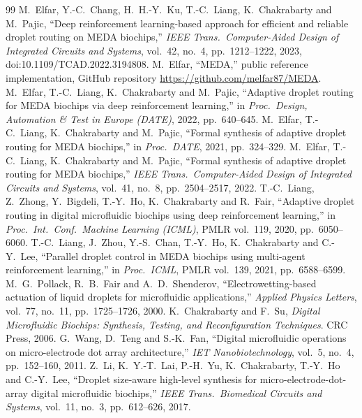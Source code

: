 \documentclass[11pt,a4paper]{article}
\begin{document}
\label{sec:refs}
\begin{thebibliography}{99}\small
{} M.~Elfar, Y.-C.~Chang, H.~H.-Y.~Ku, T.-C.~Liang, K.~Chakrabarty and M.~Pajic, ``Deep reinforcement learning-based approach for efficient and reliable droplet routing on MEDA biochips,'' \emph{IEEE Trans.\ Computer-Aided Design of Integrated Circuits and Systems}, vol.~42, no.~4, pp.~1212--1222, 2023, doi:10.1109/TCAD.2022.3194808.
 M.~Elfar, ``MEDA,'' public reference implementation, GitHub repository \url{https://github.com/melfar87/MEDA}.
 M.~Elfar, T.-C.~Liang, K.~Chakrabarty and M.~Pajic, ``Adaptive droplet routing for MEDA biochips via deep reinforcement learning,'' in \emph{Proc.\ Design, Automation \& Test in Europe (DATE)}, 2022, pp.~640--645.
 M.~Elfar, T.-C.~Liang, K.~Chakrabarty and M.~Pajic, ``Formal synthesis of adaptive droplet routing for MEDA biochips,'' in \emph{Proc.\ DATE}, 2021, pp.~324--329.
 M.~Elfar, T.-C.~Liang, K.~Chakrabarty and M.~Pajic, ``Formal synthesis of adaptive droplet routing for MEDA biochips,'' \emph{IEEE Trans.\ Computer-Aided Design of Integrated Circuits and Systems}, vol.~41, no.~8, pp.~2504--2517, 2022.
 T.-C.~Liang, Z.~Zhong, Y.~Bigdeli, T.-Y.~Ho, K.~Chakrabarty and R.~Fair, ``Adaptive droplet routing in digital microfluidic biochips using deep reinforcement learning,'' in \emph{Proc.\ Int.\ Conf.\ Machine Learning (ICML)}, PMLR vol.~119, 2020, pp.~6050--6060.
 T.-C.~Liang, J.~Zhou, Y.-S.~Chan, T.-Y.~Ho, K.~Chakrabarty and C.-Y.~Lee, ``Parallel droplet control in MEDA biochips using multi-agent reinforcement learning,'' in \emph{Proc.\ ICML}, PMLR vol.~139, 2021, pp.~6588--6599.
 M.~G.~Pollack, R.~B.~Fair and A.~D.~Shenderov, ``Electrowetting-based actuation of liquid droplets for microfluidic applications,'' \emph{Applied Physics Letters}, vol.~77, no.~11, pp.~1725--1726, 2000.
 K.~Chakrabarty and F.~Su, \emph{Digital Microfluidic Biochips: Synthesis, Testing, and Reconfiguration Techniques}. CRC Press, 2006.
 G.~Wang, D.~Teng and S.-K.~Fan, ``Digital microfluidic operations on micro-electrode dot array architecture,'' \emph{IET Nanobiotechnology}, vol.~5, no.~4, pp.~152--160, 2011.
 Z.~Li, K.~Y.-T.~Lai, P.-H.~Yu, K.~Chakrabarty, T.-Y.~Ho and C.-Y.~Lee, ``Droplet size-aware high-level synthesis for micro-electrode-dot-array digital microfluidic biochips,'' \emph{IEEE Trans.\ Biomedical Circuits and Systems}, vol.~11, no.~3, pp.~612--626, 2017.

\end{thebibliography}
\end{document}
